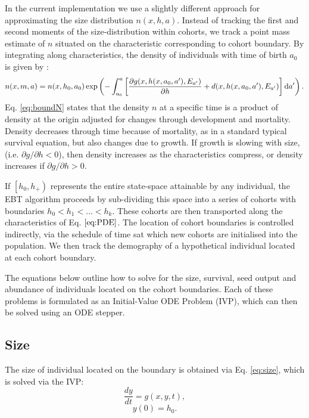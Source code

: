 \documentclass[10pt,twoside]{article}
\begin{document}
In the current implementation we use a slightly different approach for
approximating the size distribution \(n(x,h,a)\). Instead of tracking
the first and second moments of the size-distribution within cohorts, we
track a point mass estimate of \(n\) situated on the characteristic
corresponding to cohort boundary. By integrating along characteristics,
the density of individuals with time of birth \(a_{0}\) is given by
\citep{Deroos-1997}:
\begin{equation}\label{eq:boundN}
  n(x, m, a)  =n(x,h_0 ,a_0) 
   \exp \left(-\int _{a_0}^{a} \left[\frac{\partial g(x,h(x, a_0, a^\prime),E_{a^\prime})}{\partial h} +d(x,h(x, a_0, a^\prime),E_{a^\prime})\right] {\rm d}a^\prime \right).
\end{equation}
Eq. \ref{eq:boundN} states that the density \(n\) at a specific time is
a product of density at the origin adjusted for changes through
development and mortality. Density decreases through time because of
mortality, as in a standard typical survival equation, but also changes
due to growth. If growth is slowing with size, (i.e.
\(\partial g / \partial h < 0\)), then density increases as the
characteristics compress, or density increases if
\(\partial g / \partial h > 0\).

If \(\left[h_0, h_+ \right)\) represents the entire state-space
attainable by any individual, the EBT algorithm proceeds by sub-dividing
this space into a series of cohorts with boundaries
\(h_0 < h_1 < \ldots < h_k\). These cohorts are then transported along
the characteristics of Eq. \(\ref{eq:PDE}\). The location of cohort
boundaries is controlled indirectly, via the schedule of time sat which
new cohorts are initialised into the population. We then track the
demography of a hypothetical individual located at each cohort boundary.

The equations below outline how to solve for the size, survival, seed
output and abundance of individuals located on the cohort boundaries.
Each of these problems is formulated as an Initial-Value ODE Problem
(IVP), which can then be solved using an ODE stepper.

\subsection{Size}\label{size}

The size of individual located on the boundary is obtained via Eq.
\ref{eq:size}, which is solved via the IVP:
\[\frac{dy}{dt} = g(x,y,t),\] \[ y(0) = h_0.\]
\end{document}

